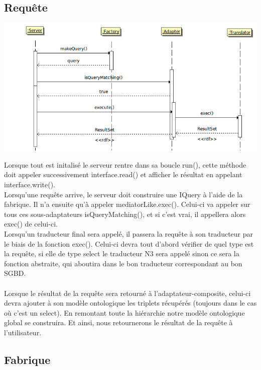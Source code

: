 \documentclass[12pt]{article}
\begin{document}
\subsection{Requête}

\begin{center}
	\includegraphics[scale=0.60]{images/sequence_requete.png}
\end{center}

Lorsque tout est initalisé le serveur rentre dans sa boucle run(), cette méthode doit appeler successivement interface.read() et afficher le résultat en appelant interface.write(). \\

\indent Lorsqu'une requête arrive, le serveur doit construire une IQuery à l'aide de la fabrique. Il n'a ensuite qu'à appeler mediatorLike.exec(). Celui-ci va appeler sur tous ces sous-adaptateurs isQueryMatching(), et si c'est vrai, il appellera alors exec() de celui-ci. \\
\indent Lorsqu'un traducteur final sera appelé, il passera la requête à son traducteur par le biais de la fonction exec(). Celui-ci devra tout d'abord vérifier de quel type est la requête, si elle de type select le traducteur N3 sera appelé sinon ce sera la fonction abstraite, qui aboutira dans le bon traducteur correspondant au bon SGBD. \\

\\ Lorsque le résultat de la requête sera retourné à l'adaptateur-composite, celui-ci devra ajouter à son modèle ontologique les triplets récupérés (toujours dans le cas où c'est un select). En remontant toute la hiérarchie notre modèle ontologique global se construira. Et ainsi, nous retournerons le résultat de la requête à l'utilisateur.

\subsection{Fabrique}
\end{document}
